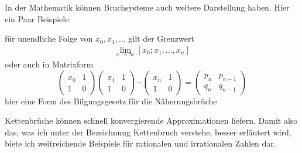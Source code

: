In der Mathematik können Bruchsysteme auch weitere Darstellung haben. 
Hier ein Paar Beispiele:

für unendliche Folge von $x_0,x_1,\dots$ gilt der Grenzwert
\begin{align*}
\lim_{x\to\infty} [x_0;x_1,\dots,x_n] 
\end{align*}  
oder auch in Matrixform
\begin{equation*}
	\begin{pmatrix}
		x_0&	1\\
		1  &	0
	\end{pmatrix}
	\begin{pmatrix}
		x_1&	1\\
		1  &	0
	\end{pmatrix}
	\cdots
	\begin{pmatrix}
		x_n&	1\\
		1  &	0
	\end{pmatrix}
	=\begin{pmatrix}
		p_n&	p_{n-1}\\
		q_n&	q_{n-1}
	\end{pmatrix} 
\end{equation*}
hier eine Form des Bilgungsgesetz für die Näherungsbrüche

Kettenbrüche können schnell konvergierende Approximationen liefern.
Damit also das, was ich unter der Bezeichnung Kettenbruch verstehe,
besser erläutert wird, biete ich weitreichende Beispiele für
rationalen und irrationalen Zahlen dar.
